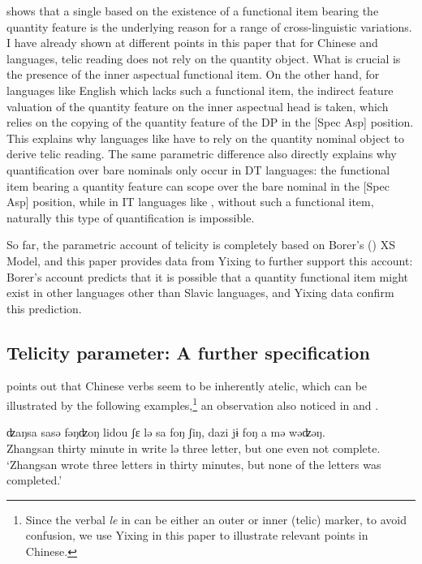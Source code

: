 \documentclass[output=paper]{langsci/langscibook}
\begin{document}
 shows that a single  based on the
existence of a functional item bearing the quantity feature is the underlying
reason for a range of cross-linguistic variations. I have already shown at
different points in this paper that for Chinese and  languages, telic
reading does not rely on the quantity object. What is crucial is the presence
of the inner aspectual functional item. On the other hand, for languages like
English which lacks such a functional item, the indirect feature valuation of
the quantity feature on the inner aspectual head is taken, which relies on the
copying of the quantity feature of the DP in the [Spec Asp] position.
This explains why languages like  have to rely on the quantity nominal
object to derive telic reading. The same parametric difference also directly
explains why quantification over bare nominals only occur in DT languages: the
functional item bearing a quantity feature can scope over the bare nominal in
the [Spec Asp] position, while in IT languages like , without
such a functional item, naturally this type of quantification is impossible.

So far, the parametric account of telicity is completely based on Borer's
(\citeyear{Borer2005b}) XS Model, and this paper provides data from Yixing to
further support this account: Borer's account predicts that it is possible that
a quantity functional item might exist in other languages other than
Slavic languages, and Yixing data confirm this
prediction.

\subsection{Telicity parameter: A further specification}\label{sub:17.5.2}

\textcite{huang2015syntactic} points out that Chinese verbs seem to be
inherently atelic, which can be illustrated by the following
examples,\footnote{Since the verbal \emph{le} in  can be either
    an outer or inner (telic) marker, to avoid confusion, we use Yixing in this
paper to illustrate relevant points in Chinese.} an observation also noticed in
\cite{tai1984} and \textcite{smith1997parameter}.\newpage

\begin{exe}
    \ex\label{inherently atelic} 
\sn
\gll ʣaŋsa {sasə} {fəŋʣoŋ} lidou {ʃε} {lə} sa {foŋ} {ʃiŋ}, dazi {jɨ} {foŋ} a {mə} wəʣəŋ. \\
    Zhangsan thirty minute in write {lə} three \Clf{} letter, but one \Clf{} even not complete. \\
    \glt \enquote*{Zhangsan wrote three letters in thirty minutes, but none of the letters was completed.}
\end{exe}
\end{document}

